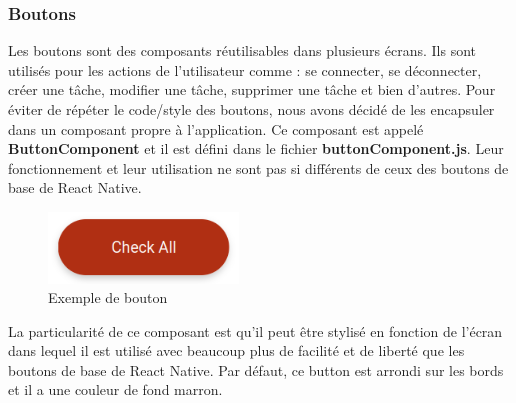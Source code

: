 \documentclass[12pt]{article}
\begin{document}
        \subsubsection{Boutons}\label{subsubsec:boutons}
        Les boutons sont des composants réutilisables dans plusieurs écrans. Ils sont utilisés pour les actions de l'utilisateur
        comme : se connecter, se déconnecter, créer une tâche, modifier une tâche, supprimer une tâche et bien d'autres.
        Pour éviter de répéter le code/style des boutons, nous avons décidé de les encapsuler dans un composant propre à l'application.
        Ce composant est appelé \textbf{ButtonComponent} et il est défini dans le fichier \textbf{buttonComponent.js}.  Leur
        fonctionnement et leur utilisation ne sont pas si différents de ceux des boutons de base de React Native.\\
        \begin{figure}[H]
            \centering
            \includegraphics[width=0.45\textwidth]{images/button}
            \caption{Exemple de bouton}
            \label{fig:button}
        \end{figure}

        La particularité de ce composant est qu'il peut être stylisé en fonction de l'écran dans lequel il est utilisé avec
        beaucoup plus de facilité et de liberté que les boutons de base de React Native. Par défaut, ce button
        est arrondi sur les bords et il a une couleur de fond marron.
\end{document}
